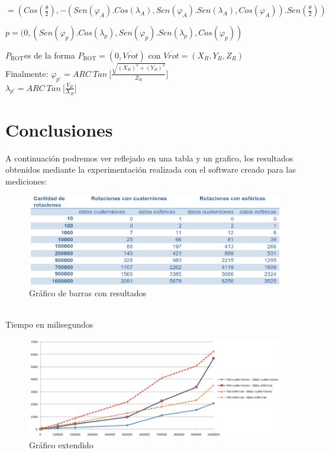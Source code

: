 \documentclass[spanish]{article}
\begin{document}
\(= (Cos(\frac{\theta}{2}), - (Sen(\varphi_{A}).Cos(\lambda_{A}),Sen(\varphi_{A}).Sen(\lambda_{A}),Cos(\varphi_{A})).Sen(\frac{\theta}{2}))\)

\(p = (0,(Sen(\varphi_{p}).Cos(\lambda_{p}),Sen(\varphi_{p}).Sen(\lambda_{p}),Cos(\varphi_{p}))\)

\(P_{\text{ROT}}\)es de la forma \(P_{\text{ROT}} = (0,\overline{Vrot})\) con
\(\overline{Vrot}= (X_{R},Y_{R},Z_{R})\)\\

Finalmente: \(\varphi_{p'} = ARC\ Tan\ \lbrack\frac{\sqrt{(X_{R})^2+(Y_{R})^2}}{Z_{R}}\rbrack\)\\

\(\lambda_{p'} = ARC\ Tan\ \lbrack\frac{Y_{R}}{X_{R}}\rbrack\)
  
\clearpage  
\section{Conclusiones}

A continuación podremos ver reflejado en una tabla y un grafico, los resultados obtenidos mediante la experimentación realizada con el software creado para las mediciones:

\begin{figure}[H]
  \centering
    \includegraphics{result.png}
  \caption{Gráfico de barras con resultados}
  \label{fig:ejemplo}
\end{figure}\\

Tiempo en milisegundos\\

\begin{figure}[H]
  \centering
    \includegraphics[scale=0.75]{resultgrafico.png}
  \caption{Gráfico extendido}
  \label{fig:ejemplo}
\end{figure}
\end{document}
